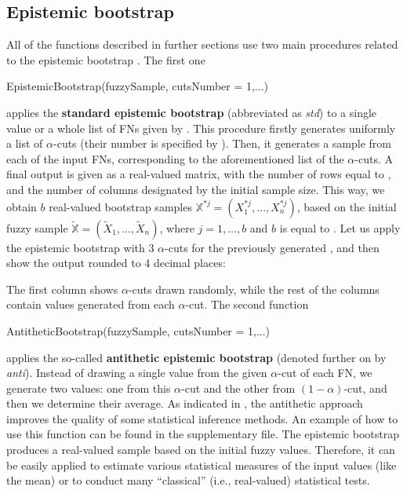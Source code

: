 \subsection{Epistemic bootstrap}
All of the functions described in further sections use two main procedures related to the epistemic bootstrap \citep{grzegorzewski2021,10.1007/978-3-031-08974-9_39,pgmr2022,PGMR2024AMS}.
The first one
\begin{example}
EpistemicBootstrap(fuzzySample, cutsNumber = 1,...)
\end{example}
applies the \textbf{standard epistemic bootstrap} (abbreviated as \emph{std}) to a single value or a whole list of FNs given by .
This procedure firstly generates uniformly a list of $\alpha$-cuts (their number is specified by ). Then, it generates a sample from each of the input FNs, corresponding to the aforementioned list of the $\alpha$-cuts.
A final output is given as a real-valued matrix, with the number of rows equal to , and the number of columns designated by the initial sample size.
This way, we obtain $b$ real-valued bootstrap samples $\mathbb{X}^{*j} = \left ( X_1^{*j}, \ldots,  X_n^{*j} \right )$, based on the initial fuzzy sample $\tilde{\mathbb{X}} = ( \tilde{X}_1, \ldots,  \tilde{X}_n)$, where $j=1, \ldots,b$ and $b$ is equal to .
Let us apply the epistemic bootstrap with 3 $\alpha$-cuts for the previously generated , and then show the output rounded to 4 decimal places:
The first column shows $\alpha$-cuts drawn randomly, while the rest of the columns contain values generated from each $\alpha$-cut.
The second function
\begin{example}
AntitheticBootstrap(fuzzySample, cutsNumber = 1,...)
\end{example}
applies the so-called \textbf{antithetic epistemic bootstrap} (denoted further on by \emph{anti}).
Instead of drawing a single value from the given $\alpha$-cut of each FN, we generate two values: one from this $\alpha$-cut and the other from $(1-\alpha)$-cut, and then we determine their average.
As indicated in \cite{10.1007/978-3-031-08974-9_39,pgmr2022}, the antithetic approach improves the quality of some statistical inference methods.
An example of how to use this function can be found in the supplementary file.
The epistemic bootstrap produces a real-valued sample based on the initial fuzzy values.
Therefore, it can be easily applied to estimate various statistical measures of the input values (like the mean) or to conduct many ``classical'' (i.e., real-valued) statistical tests.
